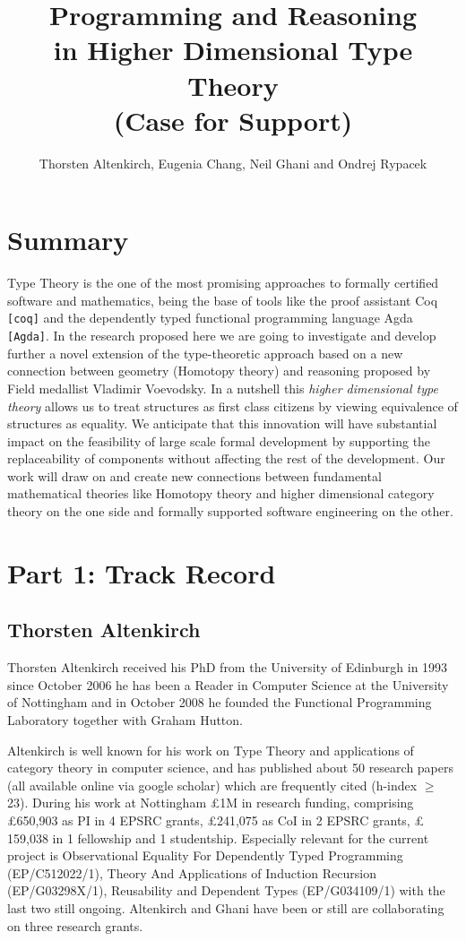 \documentclass[twocolumn,a4paper]{article}
\title{Programming and Reasoning\\ in Higher Dimensional Type Theory \\
\LARGE (Case for Support)}
\author{Thorsten Altenkirch, Eugenia Chang, Neil Ghani and Ondrej Rypacek}
\date{}
\renewcommand{\cite}[1]{{\tt[#1]}}
\begin{document}
\raggedright
\sffamily

\maketitle
\section*{Summary}
Type Theory is the one of the most promising approaches to formally
certified software and mathematics, being the base of tools like the
proof assistant Coq \cite{coq} and the dependently typed functional
programming language Agda \cite{Agda}. In the research proposed here
we are going to investigate and develop further a novel extension of
the type-theoretic approach based on a new connection between geometry
(Homotopy theory) and reasoning proposed by Field medallist Vladimir
Voevodsky. In a nutshell this \emph{higher dimensional type theory}
allows us to treat structures as first class citizens by viewing
equivalence of structures as equality. We anticipate that this
innovation will have substantial impact on the feasibility of large scale
formal development by supporting the replaceability of components
without affecting the rest of the development. Our work will draw on
and create new connections between fundamental mathematical theories
like Homotopy theory and higher dimensional category theory on the one
side and formally supported software engineering on the other.


\section*{Part 1: Track Record}

\subsection*{Thorsten Altenkirch}
Thorsten Altenkirch received his PhD from the University of
Edinburgh in 1993 since October 2006 he has been a Reader in
Computer Science at the University of Nottingham and in October
2008 he founded  the Functional Programming Laboratory together with
Graham Hutton.

Altenkirch is well known for his work on Type Theory and applications
of category theory in computer science, and has published about 50
research papers (all available online via google scholar) which are
frequently cited (h-index $\geq$ 23). During his work at Nottingham
\pounds 1M in research funding, comprising \pounds 650,903 as PI in 4
EPSRC grants, \pounds 241,075 as CoI in 2 EPSRC grants, \pounds
159,038 in 1 fellowship and 1 studentship. Especially relevant for the
current project is Observational Equality For Dependently Typed Programming
(EP/C512022/1), Theory And Applications of Induction Recursion (EP/G03298X/1),
Reusability and Dependent Types (EP/G034109/1) with the last two still
ongoing. Altenkirch and Ghani have been or still are collaborating on
three research grants.
\end{document}
